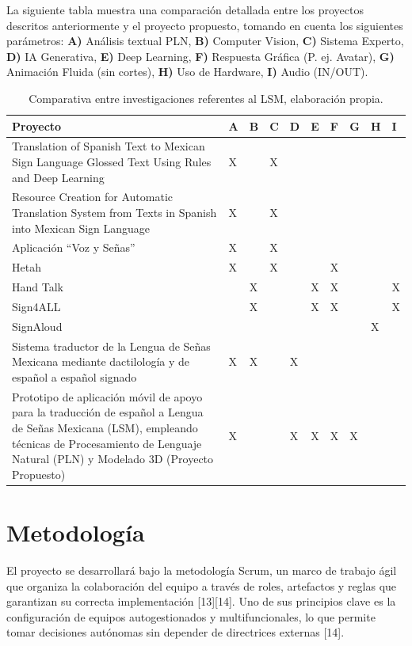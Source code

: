 \newpage
La siguiente tabla muestra una comparación detallada entre los proyectos descritos anteriormente y el proyecto propuesto, tomando en cuenta los siguientes parámetros: \textbf{A)} Análisis textual PLN, \textbf{B)} Computer Vision, \textbf{C)} Sistema Experto, \textbf{D)} IA Generativa, \textbf{E)} Deep Learning, \textbf{F)} Respuesta Gráfica (P. ej. Avatar), \textbf{G)} Animación Fluida (sin cortes), \textbf{H)} Uso de Hardware, \textbf{I)} Audio (IN/OUT).
\begin{table}[H]
    \centering
    \begin{tabular}{|p{6cm}|p{0.5cm}|p{0.5cm}|p{0.5cm}|p{0.5cm}|p{0.5cm}|p{0.5cm}|p{0.5cm}|p{0.5cm}|p{0.5cm}|}
        \hline
        \textbf{Proyecto} & \textbf{A} & \textbf{B} & \textbf{C} & \textbf{D} & \textbf{E} & \textbf{F} & \textbf{G} & \textbf{H} & \textbf{I}\\
        \hline
        Translation of Spanish Text to Mexican Sign Language Glossed Text Using Rules and Deep Learning & X &  & X &  &  &  &  &  &\\
        \hline
        Resource Creation for Automatic Translation System from Texts in Spanish into Mexican Sign Language & X &  & X &  &  &  &  &  &\\
        \hline
        Aplicación “Voz y Señas” & X &  & X &  &  &  &  &  &\\
        \hline
        Hetah & X &  & X &  &  & X &  &  &\\
        \hline
        Hand Talk &  & X &  &  & X & X &  &  & X\\
        \hline
        Sign4ALL &  & X &  &  & X & X &  &  & X\\
        \hline
        SignAloud &  &  &  &  &  &  &  & X & \\
        \hline
        Sistema traductor de la Lengua de Señas Mexicana mediante dactilología y de español a español signado & X & X &  & X &  &  &  &  & \\
        \hline
        Prototipo de aplicación móvil de apoyo para la traducción de español a Lengua de Señas Mexicana (LSM), empleando técnicas de Procesamiento de Lenguaje Natural (PLN) y Modelado 3D (Proyecto Propuesto) & X &  &  & X & X & X & X &  & \\
        \hline
    \end{tabular}
    \caption{Comparativa entre investigaciones referentes al LSM, elaboración propia.}
    \label{tabla:edo_arte}
\end{table}

\newpage
\section{Metodología}
El proyecto se desarrollará bajo la metodología Scrum, un marco de trabajo ágil que organiza la colaboración del equipo a través de roles, artefactos y reglas que garantizan su correcta implementación [13][14]. Uno de sus principios clave es la configuración de equipos autogestionados y multifuncionales, lo que permite tomar decisiones autónomas sin depender de directrices externas [14].\\

